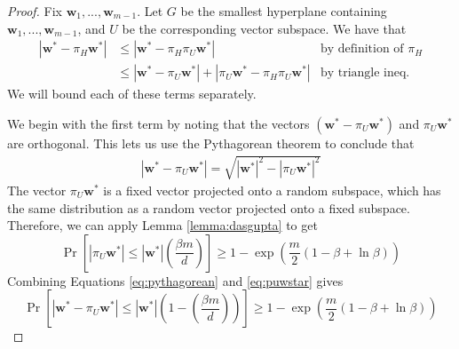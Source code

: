 \documentclass{article}
\theoremstyle{definition}
\DeclareMathOperator*{\probop}{Pr}
\newcommand{\prob}[1]{\ensuremath{\probop\left[{#1}\right]}}
\newcommand{\proj}[1]{\ensuremath{\pi}_{#1}}
\newcommand{\w}{\mathbf{w}}
\begin{document}
\begin{proof}
Fix $\w_1,...,\w_{m-1}$.
Let $G$ be the smallest hyperplane containing $\w_1,...,\w_{m-1}$,
and $U$ be the corresponding vector subspace.
We have that %
\begin{align}
|\w^* - \proj{H}\w^*|
& \le |\w^* - \proj{H}\proj{U}\w^*| & \text{by definition of $\proj{H}$}\\
& \le |\w^* - \proj{U}\w^*| + |\proj{U}\w^* - \proj{H}\proj{U}\w^*| &\text{by triangle ineq.}
\end{align}
We will bound each of these terms separately.

We begin with the first term by noting that the vectors $(\w^* - \proj{U}\w^*)$ and $\proj{U}\w^*$ are orthogonal.
This lets us use the Pythagorean theorem to conclude that
\begin{align}
\label{eq:pythagorean}
|\w^*-\proj{U}\w^*|
= \sqrt{|\w^*|^2 - |\proj{U}\w^*|^2}
\end{align}
The vector $\proj{U}\w^*$ is a fixed vector projected onto a random subspace,
which has the same distribution as a random vector projected onto a fixed subspace.
Therefore, we can apply Lemma \ref{lemma:dasgupta} to get
\begin{equation}
\label{eq:puwstar}
\prob{
    |\proj{U}\w^*|
    \le
    |\w^*|\left(\frac{\beta m}{d}\right)
}
\ge
1 - \exp\left(\frac{m}{2}(1-\beta+\ln\beta)\right)
\end{equation}
Combining Equations \ref{eq:pythagorean} and \ref{eq:puwstar} gives
\begin{equation}
\prob{
    |\w^*-\proj{U}\w^*|
    \le
    |\w^*|\left(1-\left(\frac{\beta m}{d}\right)\right)
}
\ge
1 - \exp\left(\frac{m}{2}(1-\beta+\ln\beta)\right)
\end{equation}


\end{proof}
\end{document}
